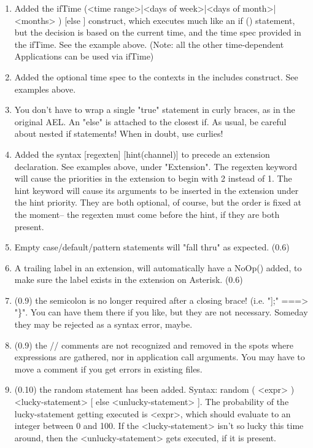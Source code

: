 {\begin{enumerate}
      extension/Macro.
  \item Added the ifTime (<time range>|<days of week>|<days of
      month>|<months> ) {} [else {}] construct, which executes much
      like an if () statement, but the decision is based on the
      current time, and the time spec provided in the ifTime. See the
      example above. (Note: all the other time-dependent Applications
      can be used via ifTime)
  \item Added the optional time spec to the contexts in the includes
      construct. See examples above.
  \item You don't have to wrap a single "true" statement in curly
      braces, as in the original AEL. An "else" is attached to the
      closest if. As usual, be careful about nested if statements!
      When in doubt, use curlies!
  \item Added the syntax [regexten] [hint(channel)] to precede an
      extension declaration. See examples above, under
      "Extension". The regexten keyword will cause the priorities in
      the extension to begin with 2 instead of 1. The hint keyword
      will cause its arguments to be inserted in the extension under
      the hint priority. They are both optional, of course, but the
      order is fixed at the moment-- the regexten must come before the
      hint, if they are both present.
  \item Empty case/default/pattern statements will "fall thru" as
      expected. (0.6)
  \item A trailing label in an extension, will automatically have a
      NoOp() added, to make sure the label exists in the extension on
      Asterisk. (0.6)
  \item (0.9) the semicolon is no longer required after a closing brace!
      (i.e. "];" ===> "\}". You can have them there if you like, but
      they are not necessary. Someday they may be rejected as a syntax
      error, maybe.
  \item (0.9) the // comments are not recognized and removed in the
      spots where expressions are gathered, nor in application call
      arguments. You may have to move a comment if you get errors in
      existing files.
  \item (0.10) the random statement has been added. Syntax: random (
      <expr> ) <lucky-statement> [ else <unlucky-statement> ]. The
      probability of the lucky-statement getting executed is <expr>,
      which should evaluate to an integer between 0 and 100. If the
      <lucky-statement> isn't so lucky this time around, then the
      <unlucky-statement> gets executed, if it is present.
\end{enumerate}


}
